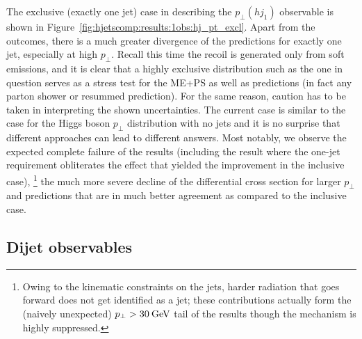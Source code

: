 The exclusive (exactly one jet) case in describing the $p_\perp(hj_1)$
observable is shown in Figure~\ref{fig:hjetscomp:results:1obs:hj_pt_excl}.
Apart from the \NNLOPS outcomes, there is a much greater divergence of
the predictions for exactly one jet, especially at high $p_\perp$.
Recall this time the recoil is generated only from soft emissions, and
it is clear that a highly exclusive distribution such as the one in
question serves as a stress test for the ME+PS as well as \NNLOPS
predictions (in fact any parton shower or resummed prediction). For
the same reason, caution has to be taken in interpreting the shown
uncertainties. The current case is similar to the case for the Higgs
boson $p_\perp$ distribution with no jets and it is no surprise that
different approaches can lead to different answers. Most notably, we
observe the expected complete failure of the \GoSam results (including
the \Loopsim result where the one-jet requirement obliterates the
effect that yielded the improvement in the inclusive case),%
\footnote{Owing to the kinematic constraints on the jets, harder
  radiation that goes forward does not get identified as a jet;
  these contributions actually form the (naively unexpected)
  $p_\perp>30\text{\:GeV}$ tail of the \GoSam results though the mechanism is
  highly suppressed.}
the much more severe decline of the \Herwig differential cross section
for larger $p_\perp$ and \NNLOPS predictions that are in much better
agreement as compared to the inclusive case.



\subsection{Dijet observables}
\label{sec:hjetscomp:results:2jobs}

